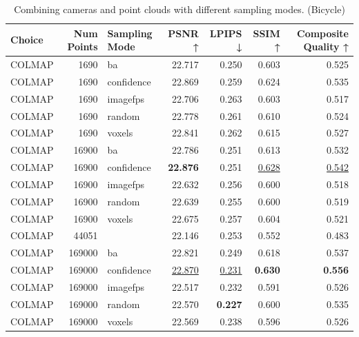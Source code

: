 \begin{table}[H]
\caption{Combining cameras and point clouds with different sampling modes. (Bicycle)}
\label{tab:07_combined_sampling_mode_full_bicycle}
\small
\begin{tabular}{lrlrrrr}
\toprule
Choice & Num Points & Sampling Mode & PSNR ↑ & LPIPS ↓ & SSIM ↑ & Composite Quality ↑ \\
\midrule
COLMAP & 1690 & ba & 22.717 & 0.250 & 0.603 & 0.525 \\
COLMAP & 1690 & confidence & 22.869 & 0.259 & 0.624 & 0.535 \\
COLMAP & 1690 & imagefps & 22.706 & 0.263 & 0.603 & 0.517 \\
COLMAP & 1690 & random & 22.778 & 0.261 & 0.610 & 0.524 \\
COLMAP & 1690 & voxels & 22.841 & 0.262 & 0.615 & 0.527 \\
COLMAP & 16900 & ba & 22.786 & 0.251 & 0.613 & 0.532 \\
COLMAP & 16900 & confidence & \textbf{22.876} & 0.251 & \underline{0.628} & \underline{0.542} \\
COLMAP & 16900 & imagefps & 22.632 & 0.256 & 0.600 & 0.518 \\
COLMAP & 16900 & random & 22.639 & 0.255 & 0.600 & 0.519 \\
COLMAP & 16900 & voxels & 22.675 & 0.257 & 0.604 & 0.521 \\
COLMAP & 44051 &  & 22.146 & 0.253 & 0.552 & 0.483 \\
COLMAP & 169000 & ba & 22.821 & 0.249 & 0.618 & 0.537 \\
COLMAP & 169000 & confidence & \underline{22.870} & \underline{0.231} & \textbf{0.630} & \textbf{0.556} \\
COLMAP & 169000 & imagefps & 22.517 & 0.232 & 0.591 & 0.526 \\
COLMAP & 169000 & random & 22.570 & \textbf{0.227} & 0.600 & 0.535 \\
COLMAP & 169000 & voxels & 22.569 & 0.238 & 0.596 & 0.526 \\
\bottomrule
\end{tabular}
\end{table}
